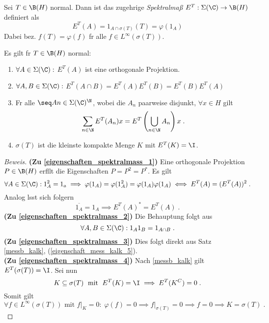 \begin{definition}
	Sei \(T\in \B(H)\) normal. Dann ist das zugeh\os rige \textit{Spektralma\ss{}} \(E^T: \Sigma(\C) \to \B(H)\) definiert als
	\[E^T(A) = 1_{A\cap \sigma(T)}(T) = \varphi(1_A)\]
	Dabei bez. \(f(T) = \varphi(f)\) f\us r alle \( f \in L^\infty(\sigma(T))\).
\end{definition}

\begin{theorem}
	Es gilt f\us r \(T\in \B(H)\) normal:
	\end{theorem}
	\begin{enumerate}
		\item \(\forall A \in \Sigma(\C):\) \(E^T(A)\) ist eine orthogonale Projektion. \label{eigenschaften_spektralmass_1}
		\item \(\forall A, B \in \Sigma(\C):\) \(E^T(A\cap B) = E^T(A)E^T(B) = E^T(B)E^T(A)\)\label{eigenschaften_spektralmass_2}
		\item F\us r alle \(\seq An \in \Sigma(\C)^\N\), wobei die $A_n$ paarweise disjunkt, \(\forall x \in H\) gilt \label{eigenschaften_spektralmass_3}
		\[\sum_{n\in\N}E^T(A_n)x = E^T\left(\bigcup_{n\in\N} A_n\right)x\;.\]
		\item \(\sigma(T)\) ist die kleinste kompakte Menge $K$ mit \(E^T(K)= \I\).\label{eigenschaften_spektralmass_4}
	\end{enumerate}
	\begin{proof}[Beweis]
		\textbf{(Zu \ref{eigenschaften_spektralmass_1})} Eine orthogonale Projektion $P\in\B(H)$ erf\us llt die Eigenschaften $P= P^2 = P^*$. Es gilt 
		\[\forall A \in \Sigma(\C): 1_A^2 = 1_a \implies \varphi(1_A) = \varphi(1_A^2) = \varphi(1_A) \varphi(1_A)  \iff E^T(A) = (E^T(A))^2\;.\]
		Analog l\as sst sich folgern
		\[\overline{1_A} = 1_A \implies E^T(A)^* = E^T(A)\;.\]
		\textbf{(Zu \ref{eigenschaften_spektralmass_2})} Die Behauptung folgt aus 
		\[\forall A, B \in \Sigma(\C): 1_A1_B = 1_{A\cap B}\;.\]
		\textbf{(Zu \ref{eigenschaften_spektralmass_3})} Dies folgt direkt aus Satz \ref{messb_kalk}, (\ref{eigenschaft_mess_kalk_5}).\\
		\textbf{(Zu \ref{eigenschaften_spektralmass_4})} Nach \ref{messb_kalk} gilt \(E^T(\sigma(T)) = \I\). Sei nun 
		\[K \subseteq \sigma(T) \;\text{ mit } \; E^T(K) = \I \implies E^T(K^C) = 0\;.\]
		Somit gilt 
		\[\forall f \in L^\infty(\sigma(T)) \text{ mit } f\vert_K = 0:\; \varphi(f) = 0 \implies f\vert_{\sigma(T)} = 0 \implies f=0 \implies K = \sigma(T)\;.\]
	\end{proof}
	
